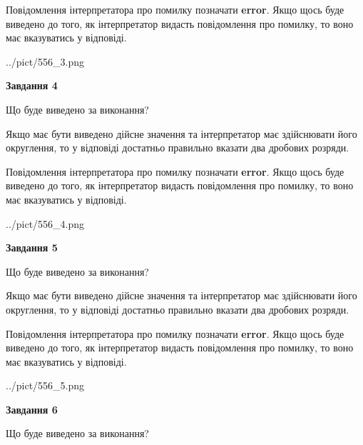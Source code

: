 \documentclass[12pt, ukrainian]{article}
\begin{document}
{\begin {Large}
Повідомлення інтерпретатора про помилку позначати \textbf{error}.
Якщо щось буде виведено до того, як інтерпретатор видасть повідомлення про помилку, 
то воно має вказуватись у відповіді. \par

\begin{center}
	{../pict/556_3.png}
\end{center}
\newpage

{\begin {center}\textbf{Завдання 4}\end {center}}\par
Що буде виведено за виконання? \par

Якщо має бути виведено дійсне значення та інтерпретатор має здійснювати його округлення, 
то у відповіді достатньо правильно вказати два дробових розряди.

Повідомлення інтерпретатора про помилку позначати \textbf{error}.
Якщо щось буде виведено до того, як інтерпретатор видасть повідомлення про помилку, 
то воно має вказуватись у відповіді. \par

\begin{center}
	{../pict/556_4.png}
\end{center}
\newpage

{\begin {center}\textbf{Завдання 5}\end {center}}\par
Що буде виведено за виконання? \par

Якщо має бути виведено дійсне значення та інтерпретатор має здійснювати його округлення, 
то у відповіді достатньо правильно вказати два дробових розряди.

Повідомлення інтерпретатора про помилку позначати \textbf{error}.
Якщо щось буде виведено до того, як інтерпретатор видасть повідомлення про помилку, 
то воно має вказуватись у відповіді. \par

\begin{center}
	{../pict/556_5.png}
\end{center}
\newpage

{\begin {center}\textbf{Завдання 6}\end {center}}\par
Що буде виведено за виконання? \par


\end{Large}}
\end{document}

